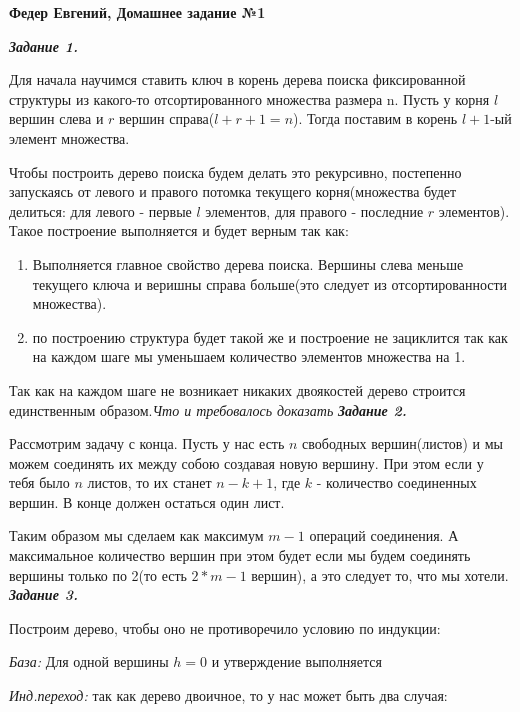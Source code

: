 \documentclass[12pt, a4paper]{scrartcl}
\begin{document}
\LARGE{\textbf{Федер Евгений, Домашнее задание №1}}\par

\emph{\textbf{Задание 1.}}\par

Для начала научимся ставить ключ в корень дерева поиска фиксированной структуры из какого-то отсортированного множества размера n.
Пусть у корня $l$ вершин слева и $r$ вершин справа($l+r+1=n$). 
Тогда поставим в корень $l+1$-ый элемент множества. 

Чтобы построить дерево поиска будем делать это рекурсивно, постепенно запускаясь от левого и правого потомка текущего корня(множества будет делиться: для левого - первые $l$ элементов, для правого - последние $r$ элементов).
Такое построение выполняется и будет верным так как:
\begin{enumerate}
	\item Выполняется главное свойство дерева поиска. Вершины слева меньше текущего ключа и веришны справа больше(это следует из отсортированности множества).
	\item по построению структура будет такой же и построение не зациклится так как на каждом шаге мы уменьшаем количество элементов множества на 1.
\end{enumerate}

Так как на каждом шаге не возникает никаких двоякостей дерево строится единственным образом.\textit{Что и требовалось доказать}
\newpage
\emph{\textbf{Задание 2.}}\par

Рассмотрим задачу с конца. Пусть у нас есть $n$ свободных вершин(листов) и мы можем соединять их между собою создавая новую вершину. При этом если у тебя было $n$ листов, то их станет $n-k+1$, где $k$ - количество соединенных вершин. В конце должен остаться один лист.

Таким образом мы сделаем как максимум $m - 1$ операций соединения. А максимальное количество вершин при этом будет если мы будем соединять вершины только по 2(то есть $2*m-1$ вершин), а это следует то, что мы хотели.
\newpage
\emph{\textbf{Задание 3.}}\par
Построим дерево, чтобы оно не противоречило условию по индукции:\par
\textit{База: } Для одной	 вершины $h=0$ и утверждение выполняется

\textit{Инд.переход: } так как дерево двоичное, то у нас может быть два случая:
\end{document}
